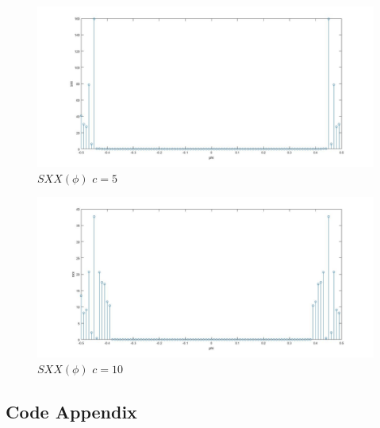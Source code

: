 \documentclass[a4paper,11pt]{article}
\begin{document}
\begin{figure}[h]
  \hspace*{-5cm}
   \includegraphics[scale=0.45]{q_2_4}
   \caption{$SXX(\phi)$ $c=5$}\label{fig:q3}
\end{figure}

\begin{figure}[h]
  \hspace*{-5cm}
   \includegraphics[scale=0.45]{q_2_5}
   \caption{$SXX(\phi)$ $c=10$}\label{fig:q3}
\end{figure}
\clearpage
\newpage
\begin{appendix}
\section*{Code Appendix}
 
\end{appendix}
\end{document}
